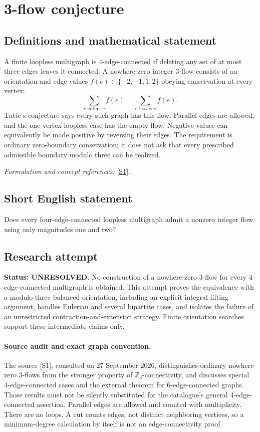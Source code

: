 \documentclass[11pt]{article}
\begin{document}
\section*{\texorpdfstring{3-flow conjecture}{3-flow conjecture}}\label{3216}
\subsection{Definitions and mathematical statement}
A finite loopless multigraph is $4$-edge-connected if deleting any set of at most three edges leaves it connected. A nowhere-zero integer $3$-flow consists of an orientation and edge values $f(e)\in\{-2,-1,1,2\}$ obeying conservation at every vertex:
\[
 \sum_{e\text{ enters }v} f(e)=\sum_{e\text{ leaves }v}f(e).
\]
Tutte's conjecture says every such graph has this flow. Parallel edges are allowed, and the one-vertex loopless case has the empty flow. Negative values can equivalently be made positive by reversing their edges. The requirement is ordinary zero-boundary conservation; it does not ask that every prescribed admissible boundary modulo three can be realized.
\par\smallskip\textit{Formulation and concept references:} \href{https://arxiv.org/pdf/1406.1554}{[S1]}.

\subsection{Short English statement}
Does every four-edge-connected loopless multigraph admit a nonzero integer flow using only magnitudes one and two?
\subsection{Research attempt}
\textbf{Status: UNRESOLVED.} No construction of a nowhere-zero 3-flow for every 4-edge-connected multigraph is obtained. This attempt proves the equivalence with a modulo-three balanced orientation, including an explicit integral lifting argument, handles Eulerian and several bipartite cases, and isolates the failure of an unrestricted contraction-and-extension strategy. Finite orientation searches support these intermediate claims only.

\paragraph{Source audit and exact graph convention.}
The source [S1], consulted on 27 September 2026, distinguishes ordinary nowhere-zero 3-flows from the stronger property of $\mathbb Z_3$-connectivity, and discusses special 4-edge-connected cases and the external theorem for 6-edge-connected graphs. Those results must not be silently substituted for the catalogue's general 4-edge-connected assertion. Parallel edges are allowed and counted with multiplicity. There are no loops. A cut counts edges, not distinct neighboring vertices, so a minimum-degree calculation by itself is not an edge-connectivity proof.
\end{document}
